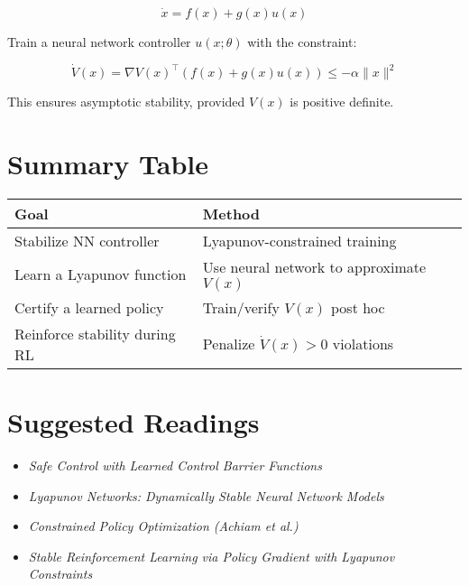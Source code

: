 \documentclass{article}
\begin{document}
\[
\dot{x} = f(x) + g(x) u(x)
\]

Train a neural network controller \( u(x; \theta) \) with the constraint:

\[
\dot{V}(x) = \nabla V(x)^\top (f(x) + g(x) u(x)) \leq -\alpha \|x\|^2
\]

This ensures asymptotic stability, provided \( V(x) \) is positive definite.

\section*{Summary Table}

\begin{tabular}{|l|l|}
\hline
\textbf{Goal} & \textbf{Method} \\
\hline
Stabilize NN controller & Lyapunov-constrained training \\
Learn a Lyapunov function & Use neural network to approximate \( V(x) \) \\
Certify a learned policy & Train/verify \( V(x) \) post hoc \\
Reinforce stability during RL & Penalize \( \dot{V}(x) > 0 \) violations \\
\hline
\end{tabular}

\section*{Suggested Readings}

\begin{itemize}
  \item \textit{Safe Control with Learned Control Barrier Functions}
  \item \textit{Lyapunov Networks: Dynamically Stable Neural Network Models}
  \item \textit{Constrained Policy Optimization (Achiam et al.)}
  \item \textit{Stable Reinforcement Learning via Policy Gradient with Lyapunov Constraints}
\end{itemize}
\end{document}
